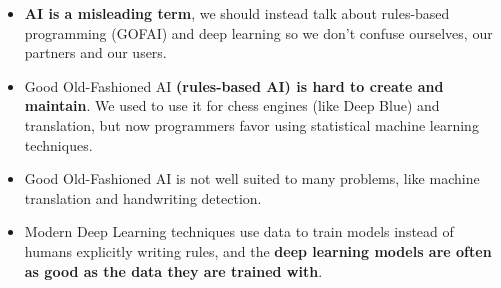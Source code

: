 \begin{itemize}
	\item \textbf{AI is a misleading term}, we should instead talk about rules-based programming (GOFAI) and deep learning so we don't confuse ourselves, our partners and our users. 
	\item Good Old-Fashioned AI \textbf{(rules-based AI) is hard to create and maintain}. We used to use it for chess engines (like Deep Blue) and translation, but now programmers favor using statistical machine learning techniques.
	\item Good Old-Fashioned AI is not well suited to many problems, like machine translation and handwriting detection.
	\item Modern Deep Learning techniques use data to train models instead of humans explicitly writing rules, and the \textbf{deep learning models are often as good as the data they are trained with}.
\end{itemize}
